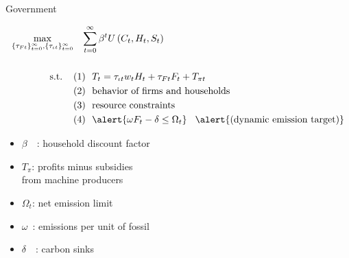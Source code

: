 \documentclass[11pt,aspectratio=169]{beamer}
\begin{document}
\addtocounter{framenumber}{-1}

\begin{frame}{ Government}
\hypertarget{gov}{}
\vspace{-4mm}
\centering
\begin{minipage}[t!]{1\textwidth}
	\begin{align*}
		\max_{\{\tau_{Ft}\}_{t=0}^{\infty}, \{\tau_{\iota t}\}_{t=0}^{\infty}}&\hspace{3mm} \sum_{t=0}^{\infty}\beta^t U\left(C_t,H_t, S_t\right)\\ \ \\
		\text{s.t.} \hspace{4mm}
		&{ (1)\ \ T_t=\tau_{\iota t}w_{t}H_{t}+{{\tau_{Ft}}}F_{t}}+T_{\pi t}\\
		& {(2)\ \  \text{behavior of firms and households}}\\
		& {(3)\ \ \text{resource constraints} }\\
		&{(4)\ \  \alert{\omega F_t-\delta \leq\Omega_t }} \hspace{3mm} \alert{\text{(dynamic emission target)}}
	\end{align*}
\end{minipage}

\small
\vspace{0mm}
\hspace{-10mm}
\begin{minipage}[t!]{0.5\textwidth}
	\vspace{7mm}
	\begin{itemize}
		\item[] $\beta$\ \ : household discount factor\vspace{-2mm}
		\item[] $T_\pi$: profits minus subsidies \\ \hspace{5.5mm} from machine producers \vspace{0mm}
	\end{itemize}
\end{minipage}
\begin{minipage}[t!]{0.45\textwidth}
	\vspace{8mm}
	\begin{itemize}
		\item[] $\Omega_{t}$: net emission limit
		\vspace{-2mm}	
		\item[] $\omega$\ : emissions per unit of fossil \vspace{-0.8mm}
		\item[] $\delta$\ \ : carbon sinks \tiny{\citep{VanVuuren2018AlternativeTechnologies}}
	\end{itemize}
\end{minipage}

\end{frame}
\end{document}
